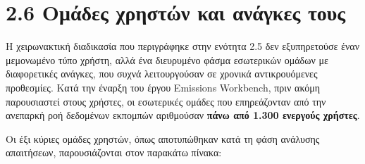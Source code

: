 \documentclass[11pt,a4paper,greek,twoside]{template-xe}
\begin{document}
\section{2.6 Ομάδες χρηστών και ανάγκες
τους}\label{ux3bfux3bcux3acux3b4ux3b5ux3c2-ux3c7ux3c1ux3b7ux3c3ux3c4ux3ceux3bd-ux3baux3b1ux3b9-ux3b1ux3bdux3acux3b3ux3baux3b5ux3c2-ux3c4ux3bfux3c5ux3c2}

Η χειρωνακτική διαδικασία που περιγράφηκε στην ενότητα 2.5 δεν
εξυπηρετούσε έναν μεμονωμένο τύπο χρήστη, αλλά ένα διευρυμένο φάσμα
εσωτερικών ομάδων με διαφορετικές ανάγκες, που συχνά λειτουργούσαν σε
χρονικά αντικρουόμενες προθεσμίες. Κατά την έναρξη του έργου Emissions
Workbench, πριν ακόμη παρουσιαστεί στους χρήστες, οι εσωτερικές ομάδες
που επηρεάζονταν από την ανεπαρκή ροή δεδομένων εκπομπών αριθμούσαν
\textbf{πάνω από 1.300 ενεργούς χρήστες}.

Οι έξι κύριες ομάδες χρηστών, όπως αποτυπώθηκαν κατά τη φάση ανάλυσης
απαιτήσεων, παρουσιάζονται στον παρακάτω πίνακα:
\end{document}
